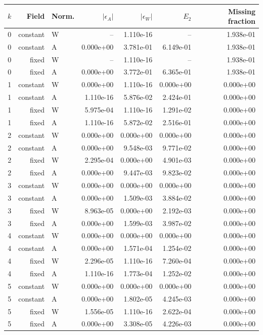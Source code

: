 \begin{tabular}{rrlrrrr}
\hline
$k$ & Field & Norm. & $|\epsilon_A|$ & $|\epsilon_W|$ & $E_2$ & Missing fraction \\
\hline
0 & constant & W & -- & 1.110e-16 & -- & 1.938e-01 \\
0 & constant & A & 0.000e+00 & 3.781e-01 & 6.149e-01 & 1.938e-01 \\
0 & fixed & W & -- & 1.110e-16 & -- & 1.938e-01 \\
0 & fixed & A & 0.000e+00 & 3.772e-01 & 6.365e-01 & 1.938e-01 \\
1 & constant & W & 0.000e+00 & 1.110e-16 & 0.000e+00 & 0.000e+00 \\
1 & constant & A & 1.110e-16 & 5.876e-02 & 2.424e-01 & 0.000e+00 \\
1 & fixed & W & 5.975e-04 & 1.110e-16 & 1.291e-02 & 0.000e+00 \\
1 & fixed & A & 1.110e-16 & 5.872e-02 & 2.516e-01 & 0.000e+00 \\
2 & constant & W & 0.000e+00 & 0.000e+00 & 0.000e+00 & 0.000e+00 \\
2 & constant & A & 0.000e+00 & 9.548e-03 & 9.771e-02 & 0.000e+00 \\
2 & fixed & W & 2.295e-04 & 0.000e+00 & 4.901e-03 & 0.000e+00 \\
2 & fixed & A & 0.000e+00 & 9.447e-03 & 9.823e-02 & 0.000e+00 \\
3 & constant & W & 0.000e+00 & 0.000e+00 & 0.000e+00 & 0.000e+00 \\
3 & constant & A & 0.000e+00 & 1.509e-03 & 3.884e-02 & 0.000e+00 \\
3 & fixed & W & 8.963e-05 & 0.000e+00 & 2.192e-03 & 0.000e+00 \\
3 & fixed & A & 0.000e+00 & 1.599e-03 & 3.987e-02 & 0.000e+00 \\
4 & constant & W & 0.000e+00 & 0.000e+00 & 0.000e+00 & 0.000e+00 \\
4 & constant & A & 0.000e+00 & 1.571e-04 & 1.254e-02 & 0.000e+00 \\
4 & fixed & W & 2.296e-05 & 1.110e-16 & 7.260e-04 & 0.000e+00 \\
4 & fixed & A & 1.110e-16 & 1.773e-04 & 1.252e-02 & 0.000e+00 \\
5 & constant & W & 0.000e+00 & 0.000e+00 & 0.000e+00 & 0.000e+00 \\
5 & constant & A & 0.000e+00 & 1.802e-05 & 4.245e-03 & 0.000e+00 \\
5 & fixed & W & 1.556e-05 & 1.110e-16 & 2.622e-04 & 0.000e+00 \\
5 & fixed & A & 0.000e+00 & 3.308e-05 & 4.226e-03 & 0.000e+00 \\
\hline
\end{tabular}
